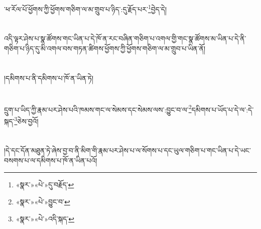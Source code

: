 ་ཕ་རོལ་པོ་ཕྱོགས་ཀྱི་ཕྱོགས་གཅིག་ལ་མ་གྲུབ་པ་ཉིད་:དུ་རྗོད་པར་\footnote{«སྣར་»«པེ་»དུ་བརྗོད་}བྱེད་དེ།\chapter{ }འདི་ལྟར་ཤེས་པ་སྣ་ཚོགས་གང་ཡིན་པ་དེ་ཁོ་ན་རང་བཞིན་གཅིག་པ་འགལ་གྱི་གང་སྣ་ཚོགས་མ་ཡིན་པ་དེ་ནི་གཅིག་པ་ཉིད་དུ་མི་འགལ་བས་གཏན་ཚིགས་ཕྱོགས་ཀྱི་ཕྱོགས་གཅིག་ལ་མ་གྲུབ་པ་ཡིན་ནོ།\chapter{ }།དམིགས་པ་ནི་དམིགས་པ་ཁོ་ན་ཡིན་ཏེ།\chapter{ }དྲུག་པ་ཡིད་ཀྱི་རྣམ་པར་ཤེས་པའི་ཁམས་གང་ལ་སེམས་དང་སེམས་ལས་:བྱུང་བ་ལ་\footnote{«སྣར་»«པེ་»བྱུང་བ་}དམིགས་པ་ཡོད་པ་དེ་ལ་:དེ་སྐད་\footnote{«སྣར་»«པེ་»འདི་སྐད་}ཅེས་བྱའོ།\chapter{ }།དེ་དང་དོན་མཐུན་ཏེ་ཞེས་བྱ་བ་ནི་མིག་གི་རྣམ་པར་ཤེས་པ་ལ་སོགས་པ་དང་ཡུལ་གཅིག་པ་གང་ཡིན་པ་དེ་ཡང་བསགས་པ་ལ་དམིགས་པ་ཁོ་ན་ཡིན་པའོ།\chap
